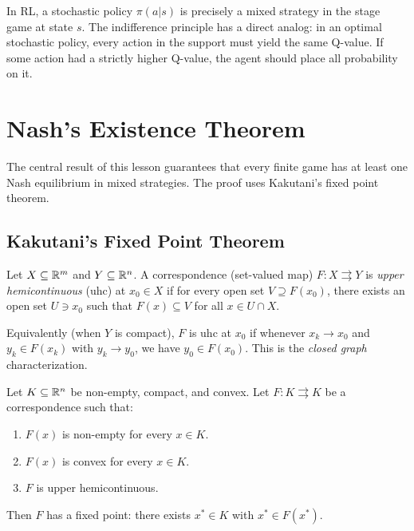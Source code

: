 \documentclass[11pt,a4paper]{article}
\begin{document}
\begin{rlconnection}
In RL, a stochastic policy $\pi(a|s)$ is precisely a mixed strategy in the
stage game at state $s$. The indifference principle has a direct analog: in
an optimal stochastic policy, every action in the support must yield the same
Q-value. If some action had a strictly higher Q-value, the agent should place
all probability on it.
\end{rlconnection}


\section{Nash's Existence Theorem}
\label{sec:nash_existence}

The central result of this lesson guarantees that every finite game has at
least one Nash equilibrium in mixed strategies. The proof uses Kakutani's
fixed point theorem.

\subsection{Kakutani's Fixed Point Theorem}
\label{subsec:kakutani}

\begin{definition}
\label{def:uhc}
Let $X \subseteq \mathbb{R}^m$ and $Y \subseteq \mathbb{R}^n$. A correspondence
(set-valued map) $F : X \rightrightarrows Y$ is \emph{upper hemicontinuous}
(uhc) at $x_0 \in X$ if for every open set $V \supseteq F(x_0)$, there
exists an open set $U \ni x_0$ such that $F(x) \subseteq V$ for all
$x \in U \cap X$.

Equivalently (when $Y$ is compact), $F$ is uhc at $x_0$ if whenever
$x_k \to x_0$ and $y_k \in F(x_k)$ with $y_k \to y_0$, we have
$y_0 \in F(x_0)$. This is the \emph{closed graph} characterization.
\end{definition}

\begin{theorem}
\label{thm:kakutani}
Let $K \subseteq \mathbb{R}^n$ be non-empty, compact, and convex. Let
$F : K \rightrightarrows K$ be a correspondence such that:
\begin{enumerate}[nosep,label=(\roman*)]
    \item $F(x)$ is non-empty for every $x \in K$.
    \item $F(x)$ is convex for every $x \in K$.
    \item $F$ is upper hemicontinuous.
\end{enumerate}
Then $F$ has a fixed point: there exists $x^* \in K$ with $x^* \in F(x^*)$.
\end{theorem}
\end{document}
